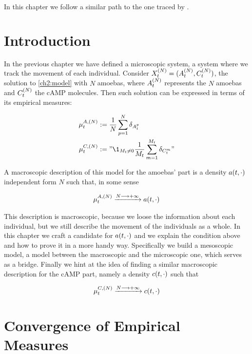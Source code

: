 \label{ch3}

In this chapter we follow a similar path to the one traced by \cite{ana}.

\section{Introduction}

In the previous chapter we have defined a microscopic system, \ie a system where we track the movement of each individual.
Consider $X_t^{(N)} = (A_t^{(N)}, C_t^{(N)})$, the solution to \ref{ch2:model} with $N$ amoebas, where $A_t^{(N)}$ represents the $N$ amoebas and $C_t^{(N)}$ the cAMP molecules.
Then such solution can be expressed in terms of its empirical measures:

\begin{equation*}
	\begin{aligned}
		\empmeas_t^{\amba,(N)}&:= \frac{1}{N}\sum_{p=1}^N \delta_{\amba_t^p}
		\\
		\empmeas_t^{\camp,(N)} &:= "\1_{\hmactive_t \neq 0} \frac{1}{\hmactive_t}\sum_{m=1}^{\hmactive_t} \delta_{\camp_t^m} "
	\end{aligned}
\end{equation*}

A macroscopic description of this model for the amoebas' part is a density $a(t,\cdot)$ independent form $N$ such that, in some sense

\begin{equation*}
	\mu_t^{A,(N)}\xrightarrow{N\longrightarrow +\infty} a(t,\cdot)
\end{equation*}

This description is macroscopic, because we loose the information about each individual, but we still describe the movement of the individuals as a whole.
In this chapter we craft a candidate for $a(t,\cdot)$ and we explain the condition above and how to prove it in a more handy way.
Specifically we build a mesoscopic model, \ie a model between the macroscopic and the microscopic one, which serves as a bridge.
Finally we hint at the idea of finding a similar macroscopic description for the cAMP part, namely a density $c(t,\cdot)$ such that

\begin{equation*}
	\mu_t^{C,(N)} \xrightarrow{N\longrightarrow +\infty} c(t,\cdot)
\end{equation*}


\section{Convergence of Empirical Measures}

